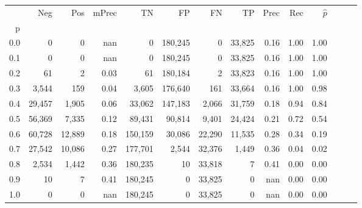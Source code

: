 \begin{tabular}{rrrrrrrrrrrrrr}
\toprule
{} &     Neg &     Pos & mPrec &       TN &       FP &      FN &      TP &  Prec &   Rec & $\hat{p}$ \\
p   &         &         &       &          &          &         &         &       &       &           \\
\midrule
0.0 &       0 &       0 &   nan &        0 &  180,245 &       0 &  33,825 &  0.16 &  1.00 &      1.00 \\
0.1 &       0 &       0 &   nan &        0 &  180,245 &       0 &  33,825 &  0.16 &  1.00 &      1.00 \\
0.2 &      61 &       2 &  0.03 &       61 &  180,184 &       2 &  33,823 &  0.16 &  1.00 &      1.00 \\
0.3 &   3,544 &     159 &  0.04 &    3,605 &  176,640 &     161 &  33,664 &  0.16 &  1.00 &      0.98 \\
0.4 &  29,457 &   1,905 &  0.06 &   33,062 &  147,183 &   2,066 &  31,759 &  0.18 &  0.94 &      0.84 \\
0.5 &  56,369 &   7,335 &  0.12 &   89,431 &   90,814 &   9,401 &  24,424 &  0.21 &  0.72 &      0.54 \\
0.6 &  60,728 &  12,889 &  0.18 &  150,159 &   30,086 &  22,290 &  11,535 &  0.28 &  0.34 &      0.19 \\
0.7 &  27,542 &  10,086 &  0.27 &  177,701 &    2,544 &  32,376 &   1,449 &  0.36 &  0.04 &      0.02 \\
0.8 &   2,534 &   1,442 &  0.36 &  180,235 &       10 &  33,818 &       7 &  0.41 &  0.00 &      0.00 \\
0.9 &      10 &       7 &  0.41 &  180,245 &        0 &  33,825 &       0 &   nan &  0.00 &      0.00 \\
1.0 &       0 &       0 &   nan &  180,245 &        0 &  33,825 &       0 &   nan &  0.00 &      0.00 \\
\bottomrule
\end{tabular}
